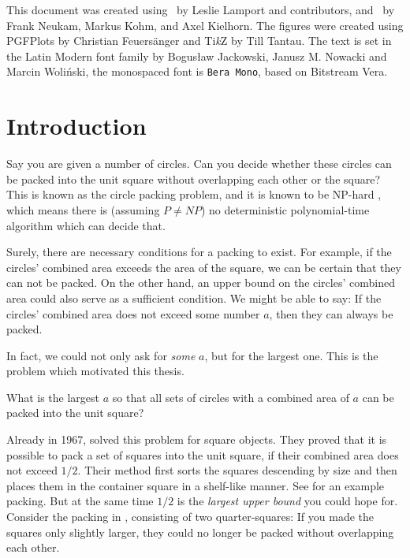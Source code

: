 \documentclass[a4paper,style=print,bibliography=totoc,nexus,lnum,extramargin]{tubsbook}
\begin{document}
This document was created using \LaTeXe\ by Leslie Lamport and contributors, and \KOMAScript\ by Frank Neukam, Markus Kohm, and Axel Kielhorn. The figures were created using PGFPlots by Christian Feuersänger and Ti\textit{k}Z by Till Tantau. The text is set in the Latin Modern font family by Bogusław Jackowski, Janusz M. Nowacki and Marcin Woliński, the monospaced font is \texttt{Bera Mono}, based on Bitstream Vera.

\cleardoublepage
\setcounter{tocdepth}{1}

\tableofcontents
\cleardoublepage

\mainmatter %

\chapter{Introduction}

Say you are given a number of circles. Can you decide whether these circles can be packed into the unit square without overlapping each other or the square? This is known as the circle packing problem, and it is known to be NP-hard \cite{DFL2010circle}, which means there is (assuming $P \ne NP$) no deterministic polynomial-time algorithm which can decide that.


Surely, there are necessary conditions for a packing to exist. For example, if the circles' combined area exceeds the area of the square, we can be certain that they can not be packed.
On the other hand, an upper bound on the circles' combined area could also serve as a sufficient condition. We might be able to say: If the circles' combined area does not exceed some number $a$, then they can always be packed.

In fact, we could not only ask for \emph{some} $a$, but for the largest one. This is the problem which motivated this thesis.

\begin{problem}\label{prb:1}
    What is the largest $a$ so that all sets of circles with a combined area of $a$ can be packed into the unit square?
\end{problem}

Already in 1967, \textcite{MM1967some} solved this problem for square objects. They proved that it is possible to pack a set of squares into the unit square, if their combined area does not exceed $1/2$. Their method first sorts the squares descending by size and then places them in the container square in a shelf-like manner. See  for an example packing. But at the same time $1/2$ is the \emph{largest upper bound} you could hope for. Consider the packing in , consisting of two quarter-squares: If you made the squares only slightly larger, they could no longer be packed without overlapping each other.
\end{document}
